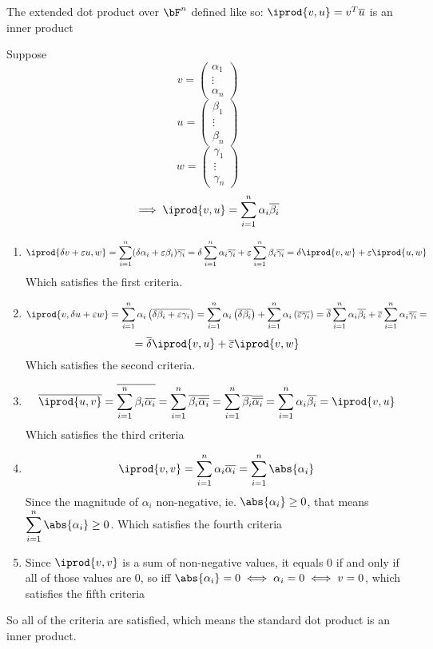 \documentclass[10pt]{article}
\begin{document}
\begin{statement}{The extended dot product over $\bF^n$ defined like so: $\iprod{v,u}=v^T\overline{u}$ is an inner product}

Suppose 
\[ v=\begin{pmatrix} \alpha_1\\\vdots\\\alpha_n\end{pmatrix} \]
\[ u =\begin{pmatrix} \beta_1\\\vdots\\\beta_n\end{pmatrix} \]
\[ w=\begin{pmatrix} \gamma_1\\\vdots\\\gamma_n\end{pmatrix} \]
\[ \implies \iprod{v,u} = \sum_{i=1}^n \alpha_i\overline{\beta_i} \]

\begin{enumerate}
    \item 
    \[ \iprod{\delta v + \varepsilon u, w} = \sum_{i=1}^n (\delta\alpha_i + \varepsilon\beta_i)\overline{\gamma_i} = \delta\sum_{i=1}^n \alpha_i\overline{\gamma_i} + \varepsilon\sum_{i=1}^n \beta_i\overline{\gamma_i} = \delta\iprod{v,w} + \varepsilon\iprod{u,w} \]
    Which satisfies the first criteria.
    
    \item \[ \iprod{v, \delta u + \varepsilon w} = \sum_{i=1}^n\alpha_i\left(\overline{\delta\beta_i+\varepsilon\gamma_i}\right) = \sum_{i=1}^n\alpha_i\left(\overline{\delta\beta_i}\right) + \sum_{i=1}^n\alpha_i\left(\overline{\varepsilon\gamma_i}\right) = \overline{\delta}\sum_{i=1}^n\alpha_i\overline{\beta_i} + \overline{\varepsilon}\sum_{i=1}^n\alpha_i\overline{\gamma_i} = \]
    \[ = \overline{\delta}\iprod{v,u}+\overline{\varepsilon}\iprod{v,w} \]
    Which satisfies the second criteria.
    
    \item \[ \overline{\iprod{u,v}} = \overline{\sum_{i=1}^n\beta_i\overline{\alpha_i}} = \sum_{i=1}^n\overline{\beta_i\overline{\alpha_i}} = \sum_{i=1}^n\overline{\beta_i}\overline{\overline{\alpha_i}} = \sum_{i=1}^n\alpha_i\overline{\beta_i} = \iprod{v,u} \]
    Which satisfies the third criteria
    
    \item \[ \iprod{v,v} = \sum_{i=1}^n\alpha_i\overline{\alpha_i} = \sum_{i=1}^n\abs{\alpha_i} \]
    Since the magnitude of $\alpha_i$ non-negative, ie. $\abs{\alpha_i}\geq0$, that means $\displaystyle\sum_{i=1}^n\abs{\alpha_i}\geq0$. Which satisfies the fourth criteria
    
    \item Since $\iprod{v,v}$ is a sum of non-negative values, it equals $0$ if and only if all of those values are $0$, so iff $\abs{\alpha_i}=0\iff\alpha_i=0\iff v=0$, which satisfies the fifth criteria
\end{enumerate}

So all of the criteria are satisfied, which means the standard dot product is an inner product.

\end{statement}
\end{document}
